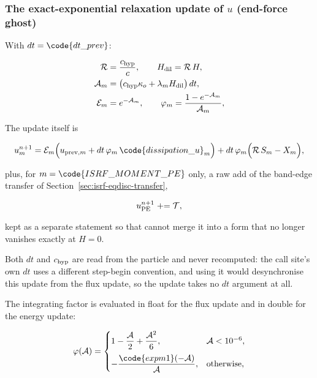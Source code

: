 \subsubsection{The exact-exponential relaxation update of $u$ (end-force ghost)}
\label{sec:isrf-eqdisc-u-update}

With $dt = \code{dt\_prev}$:

\begin{align}
  \mathcal{R} &= \frac{c_{\rm hyp}}{c},
  \qquad H_{\rm dil} = \mathcal{R}\, H,
  \label{eq:isrfd-rescale} \\
  \mathcal{A}_m &= \big(c_{\rm hyp}\kappa_o + \lambda_m H_{\rm dil}\big)\, dt,
  \label{eq:isrfd-depth-u} \\
  \mathcal{E}_m &= e^{-\mathcal{A}_m},
  \qquad
  \varphi_m = \frac{1 - e^{-\mathcal{A}_m}}{\mathcal{A}_m},
  \label{eq:isrfd-decay-u}
\end{align}

The update itself is

\begin{equation}
  u_m^{n+1} = \mathcal{E}_m\Big(u_{{\rm prev},m}
    + dt\,\varphi_m\,\code{dissipation\_u}_m\Big)
    + dt\,\varphi_m\Big(\mathcal{R}\,S_m - X_m\Big),
  \label{eq:isrfd-u-update}
\end{equation}

plus, for $m = \code{ISRF\_MOMENT\_PE}$
only, a raw add of the band-edge transfer of
Section~\ref{sec:isrf-eqdisc-transfer},

\begin{equation}
  u_{\rm PE}^{n+1} \mathrel{+}= \mathcal{T},
  \label{eq:isrfd-u-transfer-add}
\end{equation}

kept as a separate statement so that
 cannot merge it into a form that no longer vanishes exactly at
$H = 0$.

Both $dt$ and $c_{\rm hyp}$ are read from the particle and never recomputed: the
call site's own $dt$ uses a different step-begin convention, and using it would
desynchronise this update from the flux update, so the update takes no $dt$
argument at all.

The integrating factor is evaluated in float for the flux update and in double
for the energy update:

\begin{equation}
  \varphi(\mathcal{A}) =
  \begin{cases}
    1 - \dfrac{\mathcal{A}}{2} + \dfrac{\mathcal{A}^2}{6}, & \mathcal{A} < 10^{-6},\\[2ex]
    -\dfrac{\code{expm1}(-\mathcal{A})}{\mathcal{A}}, & \text{otherwise},
  \end{cases}
  \label{eq:isrfd-phi}
\end{equation}

